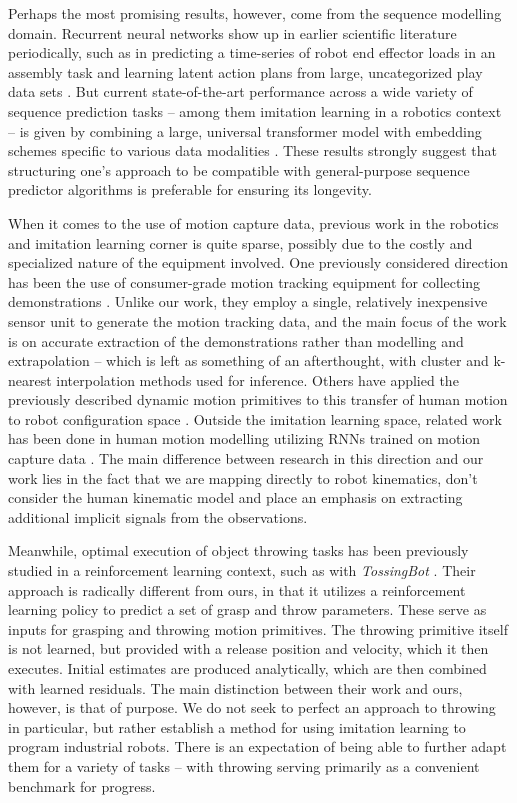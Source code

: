 \documentclass{article}
\begin{document}
Perhaps the most promising results, however, come from the sequence modelling domain. Recurrent neural networks show up in earlier scientific literature periodically, such as in predicting a time-series of robot end effector loads in an assembly task \citep{scherzinger2019contact} and learning latent action plans from large, uncategorized play data sets \citep{lynch2020learning}. But current state-of-the-art performance across a wide variety of sequence prediction tasks -- among them imitation learning in a robotics context -- is given by combining a large, universal transformer model with embedding schemes specific to various data modalities \citep{reed2022generalist}. These results strongly suggest that structuring one's approach to be compatible with general-purpose sequence predictor algorithms is preferable for ensuring its longevity.

When it comes to the use of motion capture data, previous work in the robotics and imitation learning corner is quite sparse, possibly due to the costly and specialized nature of the equipment involved. One previously considered direction has been the use of consumer-grade motion tracking equipment for collecting demonstrations \citep{jha2017imitation}. Unlike our work, they employ a single, relatively inexpensive sensor unit to generate the motion tracking data, and the main focus of the work is on accurate extraction of the demonstrations rather than modelling and extrapolation -- which is left as something of an afterthought, with cluster and k-nearest interpolation methods used for inference. Others have applied the previously described dynamic motion primitives to this transfer of human motion to robot configuration space \citep{vuga2013mocap}. Outside the imitation learning space, related work has been done in human motion modelling utilizing RNNs trained on motion capture data \citep{Fragkiadaki_2015_ICCV}. The main difference between research in this direction and our work lies in the fact that we are mapping directly to robot kinematics, don't consider the human kinematic model and place an emphasis on extracting additional implicit signals from the observations. 

Meanwhile, optimal execution of object throwing tasks has been previously studied in a reinforcement learning context, such as with \emph{TossingBot} \citep{zeng2020tossingbot}. Their approach is radically different from ours, in that it utilizes a reinforcement learning policy to predict a set of grasp and throw parameters. These serve as inputs for grasping and throwing motion primitives. The throwing primitive itself is not learned, but provided with a release position and velocity, which it then executes. Initial estimates are produced analytically, which are then combined with learned residuals. The main distinction between their work and ours, however, is that of purpose. We do not seek to perfect an approach to throwing in particular, but rather establish a method for using imitation learning to program industrial robots. There is an expectation of being able to further adapt them for a variety of tasks -- with throwing serving primarily as a convenient benchmark for progress.
\end{document}
